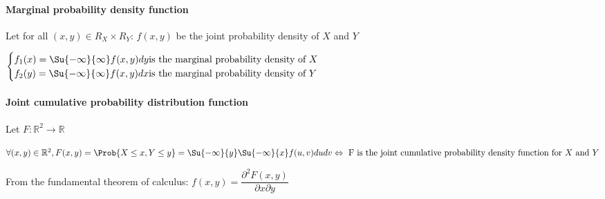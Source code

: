 \paragraph{Marginal probability density function}
Let for all $(x,y)\in R_{X}\times R_{Y}$: $f(x,y)$ be the joint probability density of $X$ and $Y$
\begin{center}
$\begin{cases}
	f_{1}(x)=\Su{{-\infty}}{\infty}f(x,y)dy\text{is the marginal probability density of }X\\
	f_{2}(y)=\Su{{-\infty}}{\infty}f(x,y)dx\text{is the marginal probability density of }Y
\end{cases}$
\end{center}
\paragraph{Joint cumulative probability distribution function}
Let $F:\mathbb{R}^{2}\rightarrow\mathbb{R}$
\begin{center}
	$\forall (x,y)\in \mathbb{R}^{2},F(x,y)=\Prob{X\leq x,Y\leq y}=\Su{ {-\infty}}{y}\Su{ {-\infty}}{x}f(u,v)dudv\Leftrightarrow\text{ F is the joint cumulative probability density function for }X\text{ and }Y$
\end{center}
From the fundamental theorem of calculus:
$f(x,y)=\dfrac{\partial^{2}F(x,y)}{\partial x\partial y}$
